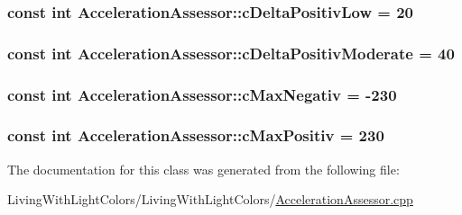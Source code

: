 \hypertarget{class_acceleration_assessor_aacf999cccafbc83bbf898881b82d14c0}{
\subsubsection[{c\+Delta\+Positiv\+Low}]{\setlength{\rightskip}{0pt plus 5cm}const int Acceleration\+Assessor\+::c\+Delta\+Positiv\+Low = 20\hspace{0.3cm}{\ttfamily [private]}}}\label{class_acceleration_assessor_aacf999cccafbc83bbf898881b82d14c0}
\hypertarget{class_acceleration_assessor_a32d8467cfba8fc770aa4af2835bd9ab7}{
\subsubsection[{c\+Delta\+Positiv\+Moderate}]{\setlength{\rightskip}{0pt plus 5cm}const int Acceleration\+Assessor\+::c\+Delta\+Positiv\+Moderate = 40\hspace{0.3cm}{\ttfamily [private]}}}\label{class_acceleration_assessor_a32d8467cfba8fc770aa4af2835bd9ab7}
\hypertarget{class_acceleration_assessor_a69ee556f7aea51f507ef1b314e5e4630}{
\subsubsection[{c\+Max\+Negativ}]{\setlength{\rightskip}{0pt plus 5cm}const int Acceleration\+Assessor\+::c\+Max\+Negativ = -\/230\hspace{0.3cm}{\ttfamily [private]}}}\label{class_acceleration_assessor_a69ee556f7aea51f507ef1b314e5e4630}
\hypertarget{class_acceleration_assessor_a1c4b1fe844d38dcb4985a6b887b2622a}{
\subsubsection[{c\+Max\+Positiv}]{\setlength{\rightskip}{0pt plus 5cm}const int Acceleration\+Assessor\+::c\+Max\+Positiv = 230\hspace{0.3cm}{\ttfamily [private]}}}\label{class_acceleration_assessor_a1c4b1fe844d38dcb4985a6b887b2622a}


The documentation for this class was generated from the following file\+:\begin{DoxyCompactItemize}
\item 
Living\+With\+Light\+Colors/\+Living\+With\+Light\+Colors/\hyperlink{_acceleration_assessor_8cpp}{Acceleration\+Assessor.\+cpp}\end{DoxyCompactItemize}
